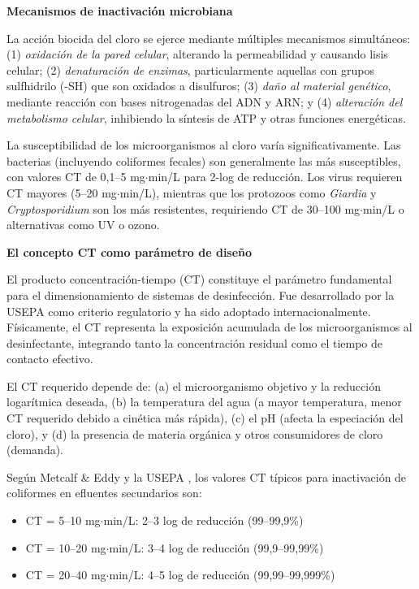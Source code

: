\documentclass[12pt,a4paper]{article}
\begin{document}
\textbf{Mecanismos de inactivación microbiana}

La acción biocida del cloro se ejerce mediante múltiples mecanismos simultáneos: (1) \textit{oxidación de la pared celular}, alterando la permeabilidad y causando lisis celular; (2) \textit{denaturación de enzimas}, particularmente aquellas con grupos sulfhidrilo (-SH) que son oxidados a disulfuros; (3) \textit{daño al material genético}, mediante reacción con bases nitrogenadas del ADN y ARN; y (4) \textit{alteración del metabolismo celular}, inhibiendo la síntesis de ATP y otras funciones energéticas.

La susceptibilidad de los microorganismos al cloro varía significativamente. Las bacterias (incluyendo coliformes fecales) son generalmente las más susceptibles, con valores CT de 0,1--5 mg$\cdot$min/L para 2-log de reducción. Los virus requieren CT mayores (5--20 mg$\cdot$min/L), mientras que los protozoos como \textit{Giardia} y \textit{Cryptosporidium} son los más resistentes, requiriendo CT de 30--100 mg$\cdot$min/L o alternativas como UV o ozono.

\textbf{El concepto CT como parámetro de diseño}

El producto concentración-tiempo (CT) constituye el parámetro fundamental para el dimensionamiento de sistemas de desinfección. Fue desarrollado por la USEPA como criterio regulatorio y ha sido adoptado internacionalmente. Físicamente, el CT representa la exposición acumulada de los microorganismos al desinfectante, integrando tanto la concentración residual como el tiempo de contacto efectivo.

El CT requerido depende de: (a) el microorganismo objetivo y la reducción logarítmica deseada, (b) la temperatura del agua (a mayor temperatura, menor CT requerido debido a cinética más rápida), (c) el pH (afecta la especiación del cloro), y (d) la presencia de materia orgánica y otros consumidores de cloro (demanda).

Según Metcalf \& Eddy \cite{metcalf2014} y la USEPA \cite{usepa2003}, los valores CT típicos para inactivación de coliformes en efluentes secundarios son:

\begin{itemize}[noitemsep,leftmargin=2em]
    \item CT = 5--10 mg$\cdot$min/L: 2--3 log de reducción (99--99,9\%)
    \item CT = 10--20 mg$\cdot$min/L: 3--4 log de reducción (99,9--99,99\%)
    \item CT = 20--40 mg$\cdot$min/L: 4--5 log de reducción (99,99--99,999\%)
\end{itemize}
\end{document}
